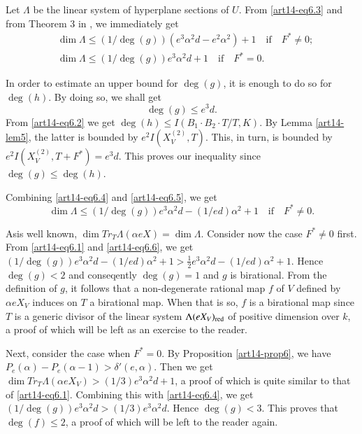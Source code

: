 Let $\Lambda$ be the linear system of hyperplane sections of $U$. From \eqref{art14-eq6.3} and from Theorem 3 in \cite{art14-key17}, we immediately get
\begin{align*}
& \dim \Lambda \leq (1/\deg (g))(e^{3}\alpha^{2}d-e^{2}\alpha^{2})+1\text{~~ if~~ }F^{*}\neq 0;\\
& \dim \Lambda \leq (1/\deg(g))e^{3}\alpha^{2}d+1\text{~~ if~~ } F^{*}=0.\tag{6.4}\label{art14-eq6.4}
\end{align*}

In order to estimate an upper bound for $\deg(g)$, it is enough to do so for $\deg(h)$. By doing so, we shall get
\begin{equation*}
\deg (g)\leq e^{3}d.\tag{6.5}\label{art14-eq6.5}
\end{equation*}
From \eqref{art14-eq6.2} we get $\deg(h)\leq I(B_{1}\cdot B_{2}\cdot T/T,K)$. By Lemma \ref{art14-lem5}, the latter is bounded by $e^{2}I(X^{(2)}_{V},T)$. This, in turn, is bounded by $e^{2}I(X^{(2)}_{V},T+F^{*})=e^{3}d$. This proves our inequality since $\deg(g)\leq \deg(h)$.

Combining \eqref{art14-eq6.4} and \eqref{art14-eq6.5}, we get
\begin{equation*}
\dim \Lambda \leq (1/\deg (g))e^{3}\alpha^{2}d-(1/ed)\alpha^{2}+1\text{~~ if~~ } F^{*}\neq 0. \tag{6.6}\label{art14-eq6.6}
\end{equation*}

As\pageoriginale is well known, $\dim Tr_{T}\Lambda(\alpha eX)=\dim \Lambda$. Consider now the case $F^{*}\neq 0$ first. From \eqref{art14-eq6.1} and \eqref{art14-eq6.6}, we get $(1/\deg(g))e^{3}\alpha^{2}d-(1/ed)\alpha^{2}+1>\frac{1}{2}e^{3}\alpha^{2}d-(1/ed)\alpha^{2}+1$. Hence $\deg(g)<2$ and conseqently $\deg(g)=1$  and $g$ is birational. From the definition of $g$, it follows that a non-degenerate rational map $f$ of $V$ defined by $\alpha eX_{V}$ induces on $T$ a birational map. When that is so, $f$ is a birational map since $T$ is a generic divisor of the linear system $\Lambda(eX_{V})_{\operatorname{\mathrm{red}}}$ of positive dimension over $k$, a proof of which will be left as an exercise to the reader.

Next, consider the case when $F^{*}=0$. By Proposition \ref{art14-prop6}, we have $P_{e}(\alpha)-P_{e}(\alpha-1)>\delta'(e,\alpha)$. Then we get $\dim Tr_{T}\Lambda (\alpha eX_{V})>(1/3)e^{3}\alpha^{2}d+1$, a proof of which is quite similar to that of \eqref{art14-eq6.1}. Combining this with \eqref{art14-eq6.4}, we get $(1/\deg (g))e^{3}\alpha^{2}d>(1/3)e^{3}\alpha^{2}d$. Hence $\deg(g)<3$. This proves that $\deg(f)\leq 2$, a proof of which will be left to the reader again.

